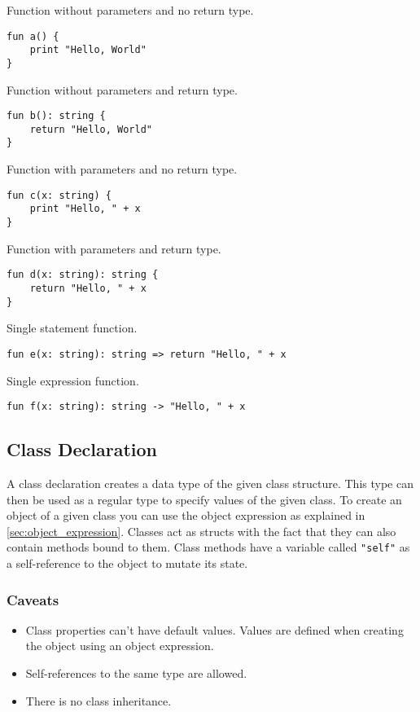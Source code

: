 Function without parameters and no return type.
\begin{lstlisting}
fun a() {
    print "Hello, World"
}
\end{lstlisting}
Function without parameters and return type.
\begin{lstlisting}
fun b(): string {
    return "Hello, World"
}
\end{lstlisting}
Function with parameters and no return type.
\begin{lstlisting}
fun c(x: string) {
    print "Hello, " + x
}
\end{lstlisting}
Function with parameters and return type.
\begin{lstlisting}
fun d(x: string): string {
    return "Hello, " + x
}
\end{lstlisting}
Single statement function.
\begin{lstlisting}
fun e(x: string): string => return "Hello, " + x
\end{lstlisting}
Single expression function.
\begin{lstlisting}
fun f(x: string): string -> "Hello, " + x
\end{lstlisting}

\subsection{Class Declaration}

A class declaration creates a data type of the given class structure. This type can then be used as a regular type
to specify values of the given class. To create an object of a given class you can use the object expression as explained in \autoref{sec:object_expression}.
Classes act as structs with the fact that they can also contain methods bound to them. Class methods have a variable called \texttt{"self"}
as a self-reference to the object to mutate its state.

\subsubsection{Caveats}

\begin{itemize}
    \item Class properties can't have default values. Values are defined when creating the object using an object expression.
    \item Self-references to the same type are allowed.
    \item There is no class inheritance.
\end{itemize}

